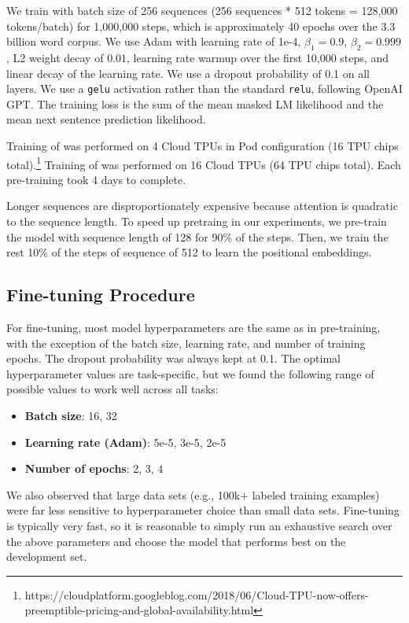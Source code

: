 We train with batch size of 256 sequences (256 sequences * 512 tokens = 128,000 tokens/batch) for 1,000,000 steps, which is approximately 40 epochs over the 3.3 billion word corpus. We use Adam with learning rate of 1e-4, ${\beta}_1=0.9$, ${\beta}_2=0.999$, L2 weight decay of $0.01$, learning rate warmup over the first 10,000 steps, and linear decay of the learning rate. We use a dropout probability of 0.1 on all layers. We use a {\tt gelu} activation \cite{hendrycks:2016} rather than the standard {\tt relu}, following OpenAI GPT. The training loss is the sum of the mean masked LM likelihood and the mean next sentence prediction likelihood.

Training of \bertbase was performed on 4 Cloud TPUs in Pod configuration (16 TPU chips total).\footnote{https://cloudplatform.googleblog.com/2018/06/Cloud-TPU-now-offers-preemptible-pricing-and-global-availability.html} Training of \bertlarge was performed on 16 Cloud TPUs (64 TPU chips total). Each pre-training took 4 days to complete.

Longer sequences are disproportionately expensive because attention is quadratic to the sequence length. To speed up pretraing in our experiments, we pre-train the model with sequence length of 128 for 90\% of the steps. Then, we train
the rest 10\% of the steps of sequence of 512 to learn the positional embeddings.

\subsection{Fine-tuning Procedure}
For fine-tuning, most model hyperparameters are the same as in pre-training, with the exception of the batch size, learning rate, and number of training epochs. The dropout probability was always kept at 0.1. The optimal hyperparameter values are task-specific, but we found the following range of possible values to work well across all tasks:

\begin{itemize}[noitemsep]
\item {\bf Batch size}: 16, 32
\item {\bf Learning rate (Adam)}: 5e-5, 3e-5, 2e-5
\item {\bf Number of epochs}: 2, 3, 4
\end{itemize}

We also observed that large data sets (e.g., 100k+ labeled training examples) were far less sensitive to hyperparameter choice than small data sets. Fine-tuning is typically very fast, so it is reasonable to simply run an exhaustive search over the above parameters and choose the model that performs best on the development set.

